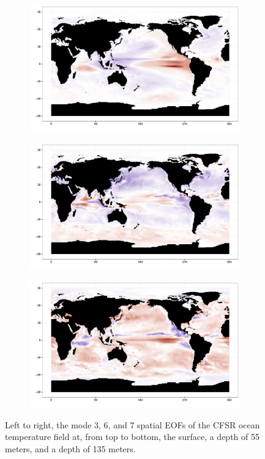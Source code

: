 \begin{figure}[h!bt]
\begin{subfigure}{.3\textwidth}
  \end{subfigure}
  \begin{subfigure}{.3\textwidth}
    \centering
    \includegraphics[width=.9\linewidth]{images/EOF3_135.pdf}
  \end{subfigure}
  \begin{subfigure}{.3\textwidth}
    \centering
    \includegraphics[width=.9\linewidth]{images/EOF6_135.pdf}
  \end{subfigure}
  \begin{subfigure}{.3\textwidth}
    \centering
    \includegraphics[width=.9\linewidth]{images/EOF7_135.pdf}
  \end{subfigure}
  \caption{Left to right, the mode 3, 6, and 7 spatial EOFs of the CFSR ocean temperature field at, from top to bottom, the surface, a depth of 55 meters, and a depth of 135 meters. }
  \label{fig:spatialEOFs}
\end{figure}

